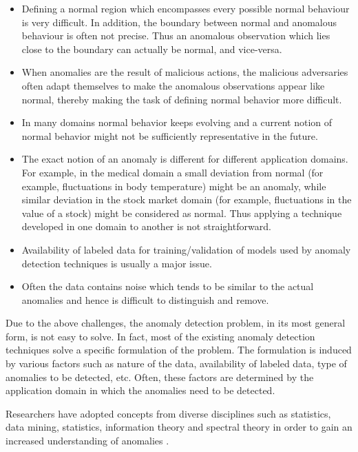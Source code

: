 \begin{itemize}

\item Defining a normal region which encompasses every possible normal behaviour
is very difficult. In addition, the boundary between normal and anomalous
behaviour is often not precise. Thus an anomalous observation which lies close
to the boundary can actually be normal, and vice-versa.

\item When anomalies are the result of malicious actions, the malicious
adversaries often adapt themselves to make the anomalous observations appear
like normal, thereby making the task of defining normal behavior more difficult.

\item In many domains normal behavior keeps evolving and a current notion of
normal behavior might not be sufficiently representative in the future.

\item The exact notion of an anomaly is different for different application
domains. For example, in the medical domain a small deviation from normal (for
example, fluctuations in body temperature) might be an anomaly, while similar
deviation in the stock market domain (for example, fluctuations in the value of
a stock) might be considered as normal. Thus applying a technique developed in
one domain to another is not straightforward.

\item Availability of labeled data for training/validation of models used by
anomaly detection techniques is usually a major issue.

\item Often the data contains noise which tends to be similar to the actual
anomalies and hence is difficult to distinguish and remove.

\end{itemize}

Due to the above challenges, the anomaly detection problem, in its most general
form, is not easy to solve. In fact, most of the existing anomaly detection
techniques solve a specific formulation of the problem. The formulation is
induced by various factors such as nature of the data, availability of labeled
data, type of anomalies to be detected, etc. Often, these factors are determined
by the application domain in which the anomalies need to be detected.

Researchers have adopted concepts from diverse disciplines such as statistics,
data mining, statistics, information theory and spectral theory in order to gain
an increased understanding of anomalies \cite{Chandola:2007}.

